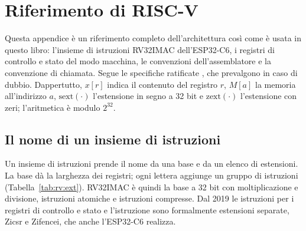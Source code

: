 \chapter{Riferimento di RISC-V}
\label{app:riscv}

Questa appendice è un riferimento completo dell'architettura \riscv così come
è usata in questo libro: l'insieme di istruzioni RV32IMAC dell'ESP32-C6, i
registri di controllo e stato del modo macchina, le convenzioni
dell'assemblatore e la convenzione di chiamata. Segue le specifiche ratificate
\citep{riscvisa,riscvpriv,riscvabi,riscvasm}, che prevalgono in caso di
dubbio. Dappertutto, $x[r]$ indica il contenuto del registro $r$, $M[a]$ la
memoria all'indirizzo $a$, $\mathrm{sext}(\cdot)$ l'estensione in segno a 32
bit e $\mathrm{zext}(\cdot)$ l'estensione con zeri; l'aritmetica è modulo
$2^{32}$.

\section{Il nome di un insieme di istruzioni}

Un insieme di istruzioni \riscv prende il nome da una base e da un elenco di
estensioni. La base dà la larghezza dei registri; ogni lettera aggiunge un
gruppo di istruzioni (Tabella~\ref{tab:rv:ext}). RV32IMAC è quindi la base a 32
bit con moltiplicazione e divisione, istruzioni atomiche e istruzioni
compresse. Dal 2019 le istruzioni per i registri di controllo e stato e
l'istruzione  sono formalmente estensioni separate, Zicsr e
Zifencei, che anche l'ESP32-C6 realizza.

